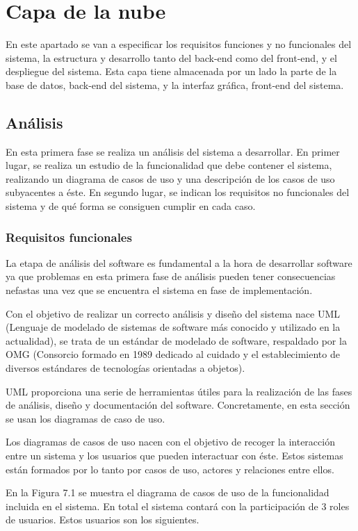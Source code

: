 \chapter{Capa de la nube}
En este apartado se van a especificar los requisitos funciones y no funcionales del sistema, la estructura y desarrollo tanto del back-end como del front-end, y el despliegue del sistema. Esta capa tiene almacenada por un lado la parte de la base de datos, back-end del sistema, y la interfaz gráfica, front-end del sistema. 

\section{Análisis}
En esta primera fase se realiza un análisis del sistema a desarrollar. En primer lugar, se realiza un estudio de la funcionalidad que debe contener el sistema, realizando un diagrama de casos de uso y una descripción de los casos de uso subyacentes a éste. En segundo lugar, se indican los requisitos no funcionales del sistema y de qué forma se consiguen cumplir en cada caso.

\subsection{Requisitos funcionales}
La etapa de análisis del software es fundamental a la hora de desarrollar software ya que problemas en esta primera fase de análisis pueden tener consecuencias nefastas una vez que se encuentra el sistema en fase de implementación.

Con el objetivo de realizar un correcto análisis y diseño del sistema nace UML (Lenguaje de modelado de sistemas de software más conocido y utilizado en la actualidad), se trata de un estándar de modelado de software, respaldado por la OMG (Consorcio formado en 1989 dedicado al cuidado y el establecimiento de diversos estándares de tecnologías orientadas a objetos).

UML proporciona una serie de herramientas útiles para la realización de las fases de análisis, diseño y documentación del software. Concretamente, en esta sección se usan los diagramas de caso de uso.

Los diagramas de casos de uso nacen con el objetivo de recoger la interacción entre un sistema y los usuarios que pueden interactuar con éste. Estos sistemas están formados por lo tanto por casos de uso, actores y relaciones entre ellos.

En la Figura 7.1 se muestra el diagrama de casos de uso de la funcionalidad incluida en el sistema. En total el sistema contará con la participación de 3 roles de usuarios. Estos usuarios son los siguientes.

